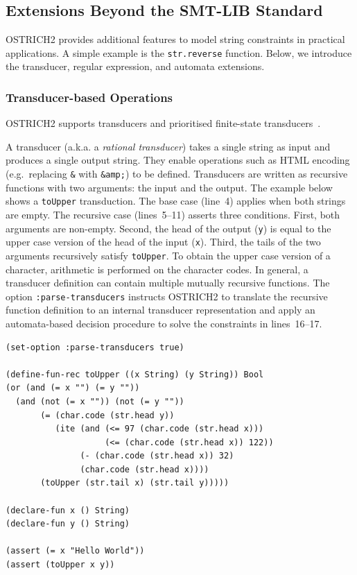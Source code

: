 \subsection{Extensions Beyond the SMT-LIB Standard}

OSTRICH2 provides additional features to model string constraints in practical applications.
A simple example is the \verb+str.reverse+ function.
Below, we introduce the transducer, regular expression, and automata extensions.

\subsubsection{Transducer-based Operations}

OSTRICH2 supports transducers and prioritised finite-state transducers~\cite{BDM14,BM17,popl22}.

A transducer (a.k.a. a \emph{rational transducer}) takes a single string as 
input and produces a single output string.
They enable operations such as HTML encoding (e.g.\ replacing \verb+&+ with \verb+&amp;+) to be defined.
Transducers are written as recursive functions with two arguments: the input and the output.
The example below shows a \verb+toUpper+ transduction.
The base case (line~4) applies when both strings are empty.
The recursive case (lines~5--11) asserts three conditions.
First, both arguments are non-empty.
Second, the head of the output (\verb+y+) is equal to the upper case version of the head of the input (\verb+x+).
Third, the tails of the two arguments recursively satisfy \verb+toUpper+.
To obtain the upper case version of a character, arithmetic is
performed on the character codes. In general, a transducer definition
can
contain multiple mutually recursive functions. The option
\verb!:parse-transducers! instructs OSTRICH2 to translate the recursive
function definition to an internal transducer representation and apply
an automata-based decision procedure to solve the constraints in lines~16--17.

\begin{lstlisting}[language=SMTLib,frame=single]
(set-option :parse-transducers true)

(define-fun-rec toUpper ((x String) (y String)) Bool
(or (and (= x "") (= y ""))
  (and (not (= x "")) (not (= y ""))
       (= (char.code (str.head y))
          (ite (and (<= 97 (char.code (str.head x)))
                    (<= (char.code (str.head x)) 122))
               (- (char.code (str.head x)) 32)
               (char.code (str.head x))))
       (toUpper (str.tail x) (str.tail y)))))

(declare-fun x () String)
(declare-fun y () String)

(assert (= x "Hello World"))
(assert (toUpper x y))
\end{lstlisting}


